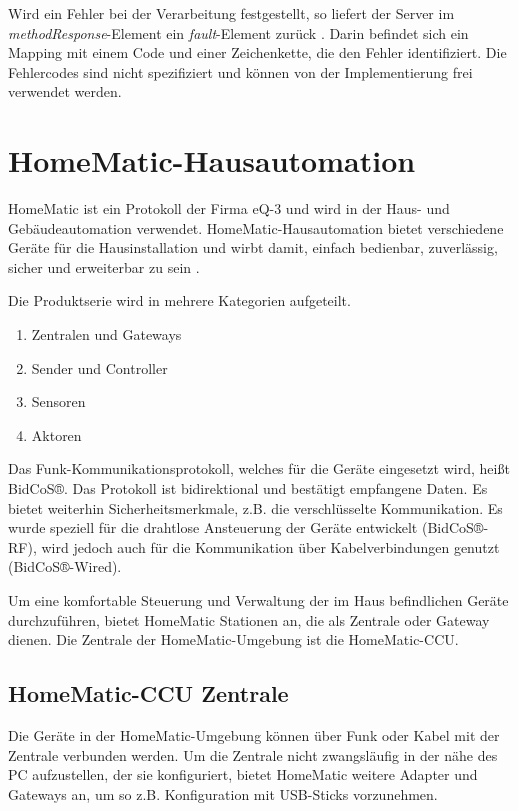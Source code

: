 Wird ein Fehler bei der Verarbeitung festgestellt, so liefert der Server im \emph{methodResponse}-Element
ein \emph{fault}-Element zurück \cite{xmlrpc}.
Darin befindet sich ein Mapping mit einem Code und einer Zeichenkette, die den Fehler identifiziert.
Die Fehlercodes sind nicht spezifiziert und können von der Implementierung frei verwendet werden.

\section{HomeMatic-Hausautomation}
\label{gru_hm_ha}

HomeMatic ist ein Protokoll der Firma eQ-3 und wird in der Haus- und Gebäudeautomation
verwendet.
HomeMatic-Hausautomation bietet verschiedene Geräte für die Hausinstallation und wirbt damit,
einfach bedienbar, zuverlässig, sicher und erweiterbar zu sein \cite{homematic_eq3}.

Die Produktserie wird in mehrere Kategorien aufgeteilt.
\begin{enumerate}
\item{Zentralen und Gateways}
\item{Sender und Controller}
\item{Sensoren}
\item{Aktoren}
\end{enumerate}

Das Funk-Kommunikationsprotokoll, welches für die Geräte eingesetzt wird, heißt BidCoS®.
Das Protokoll ist bidirektional und bestätigt empfangene Daten.
Es bietet weiterhin Sicherheitsmerkmale, z.B. die verschlüsselte Kommunikation.
Es wurde speziell für die drahtlose Ansteuerung der Geräte entwickelt \cite{homematic_eq3_faq} (BidCoS®-RF),
wird jedoch auch für die Kommunikation über Kabelverbindungen genutzt (BidCoS®-Wired).

Um eine komfortable Steuerung und Verwaltung der im Haus befindlichen Geräte durchzuführen,
bietet HomeMatic Stationen an, die als Zentrale oder Gateway dienen.
Die Zentrale der HomeMatic-Umgebung ist die HomeMatic-CCU.

\subsection{HomeMatic-CCU Zentrale}
\label{gru_hm_ccu}

Die Geräte in der HomeMatic-Umgebung können über Funk oder Kabel mit der Zentrale verbunden
werden.
Um die Zentrale nicht zwangsläufig in der nähe des PC aufzustellen, der sie konfiguriert,
bietet HomeMatic weitere Adapter und Gateways an, um so z.B. Konfiguration mit USB-Sticks vorzunehmen.

